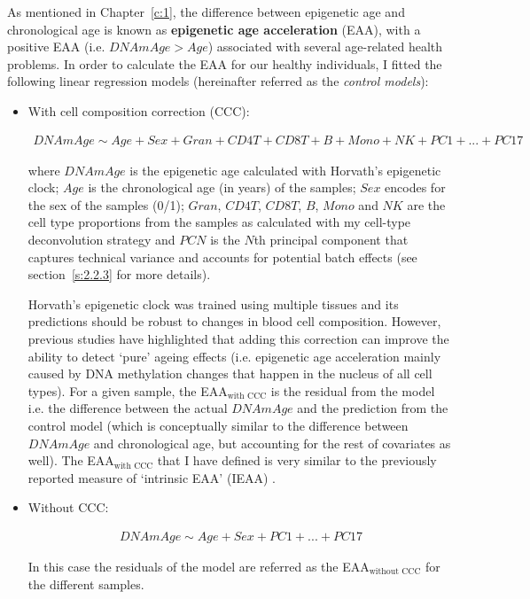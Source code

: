 \bigskip

As mentioned in Chapter~\ref{c:1}, the difference between epigenetic age and chronological age is known as \textbf{epigenetic age acceleration} (\acrshort{EAA}), with a positive EAA (i.e. $DNAmAge > Age$) associated with several age-related health problems. In order to calculate the EAA for our healthy individuals, I fitted the following linear regression models (hereinafter referred as the \textit{control models}):

\begin{itemize}
	
	\item With cell composition correction (CCC):
	
	\begin{align} \label{eq:2.13}
	 DNAmAge \sim Age + Sex+ Gran + CD4T + CD8T + B + Mono + NK + PC1 + ... + PC17
	\end{align}
	
	where $DNAmAge$ is the epigenetic age calculated with Horvath's epigenetic clock; $Age$ is the chronological age (in years) of the samples; $Sex$ encodes for the sex of the samples (0/1); $Gran$, $CD4T$, $CD8T$, $B$, $Mono$ and $NK$ are the cell type proportions from the samples as calculated with my cell-type deconvolution strategy and $PCN$ is the $N$th principal component that captures technical variance and accounts for potential batch effects (see section~\ref{s:2.2.3} for more details). 
	
	Horvath's epigenetic clock was trained using multiple tissues and its predictions should be robust to changes in blood cell composition. However, previous studies have highlighted that adding this correction can improve the ability to detect `pure' ageing effects \cite{Horvath2016, Chen2016} (i.e. epigenetic age acceleration mainly caused by DNA methylation changes that happen in the nucleus of all cell types). For a given sample, the EAA$_{\text{with CCC}}$ is the residual from the model i.e. the difference between the actual $DNAmAge$ and the prediction from the control model (which is conceptually similar to the difference between $DNAmAge$ and chronological age, but accounting for the rest of covariates as well). The EAA$_{\text{with CCC}}$ that I have defined is very similar to the previously reported measure of `intrinsic EAA' (\acrshort{IEAA}) \cite{Horvath2016, Chen2016}.
	
	\item Without CCC:
	
	\begin{align} \label{eq:2.14}
	DNAmAge \sim Age + Sex+ PC1 + ... + PC17
	\end{align}
	
	In this case the residuals of the model are referred as the EAA$_{\text{without CCC}}$ for the different samples.
	
\end{itemize}

